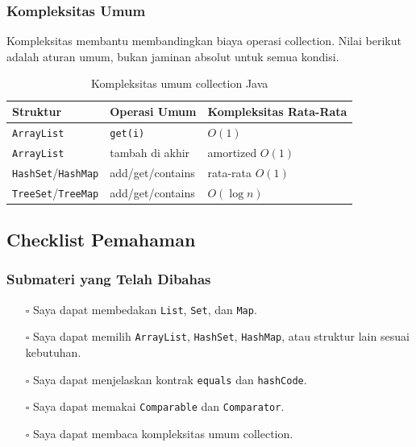\subsubsection{Kompleksitas Umum}

\begin{jawab}
Kompleksitas membantu membandingkan biaya operasi collection. Nilai berikut adalah aturan umum, bukan jaminan absolut untuk semua kondisi.
\end{jawab}

\begin{table}[H]
\centering
\begin{tabularx}{\textwidth}{|L{0.25\textwidth}|L{0.25\textwidth}|X|}
\hline
\textbf{Struktur} & \textbf{Operasi Umum} & \textbf{Kompleksitas Rata-Rata} \\
\hline
\texttt{ArrayList} & \texttt{get(i)} & $O(1)$ \\
\hline
\texttt{ArrayList} & tambah di akhir & amortized $O(1)$ \\
\hline
\texttt{HashSet}/\texttt{HashMap} & add/get/contains & rata-rata $O(1)$ \\
\hline
\texttt{TreeSet}/\texttt{TreeMap} & add/get/contains & $O(\log n)$ \\
\hline
\end{tabularx}
\caption{Kompleksitas umum collection Java}
\label{tab:kompleksitas-collection}
\end{table}

\subsection{Checklist Pemahaman}

\subsubsection{Submateri yang Telah Dibahas}

\begin{itemize}
    \item[$\square$] Saya dapat membedakan \texttt{List}, \texttt{Set}, dan \texttt{Map}.
    \item[$\square$] Saya dapat memilih \texttt{ArrayList}, \texttt{HashSet}, \texttt{HashMap}, atau struktur lain sesuai kebutuhan.
    \item[$\square$] Saya dapat menjelaskan kontrak \texttt{equals} dan \texttt{hashCode}.
    \item[$\square$] Saya dapat memakai \texttt{Comparable} dan \texttt{Comparator}.
    \item[$\square$] Saya dapat membaca kompleksitas umum collection.
\end{itemize}


